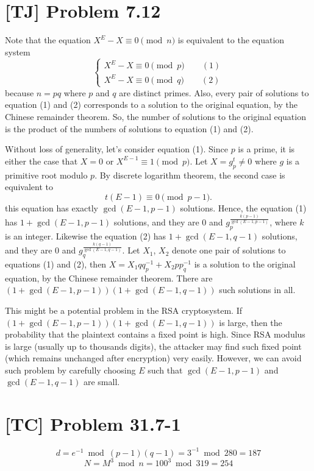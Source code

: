 \documentclass[a4paper,11pt]{article}
\begin{document}
  \section{[TJ] Problem 7.12}
  Note that the equation $X^E - X \equiv 0 \pmod n$ is equivalent to the equation system
$$ \begin{cases} X^E - X \equiv 0 \pmod p \qquad (1) \\ X^E - X \equiv 0 \pmod q \qquad (2) \end{cases} $$
  because $n = pq$ where $p$ and $q$ are distinct primes. Also, every pair of solutions to equation (1) and (2) corresponds to a solution to the original equation, by the Chinese remainder theorem. So, the number of solutions to the original equation is the product of the numbers of solutions to equation (1) and (2). \par
  Without loss of generality, let's consider equation (1). Since $p$ is a prime, it is either the case that $X = 0$ or $X^{E-1} \equiv 1 \pmod p$. Let $X = g_p^t \neq 0$ where $g$ is a primitive root modulo $p$. By discrete logarithm theorem, the second case is equivalent to
  $$t(E-1) \equiv 0 \pmod{p-1}.$$
  this equation has exactly $\gcd(E-1, p-1)$ solutions. Hence, the equation (1) has $1 + \gcd(E-1, p-1)$ solutions, and they are $0$ and $g_p^{\frac{k(p-1)}{\gcd(E-1, p-1)}}$, where $k$ is an integer. Likewise the equation (2) has $1 + \gcd(E-1, q-1)$ solutions, and they are $0$ and $g_q^{\frac{k(q-1)}{\gcd(E-1, q-1)}}$. Let $X_1$, $X_2$ denote one pair of solutions to equations (1) and (2), then $X = X_1 q q^{-1}_p + X_2 p p^{-1}_q$ is a solution to the original equation, by the Chinese remainder theorem. There are $(1 + \gcd(E-1, p-1))(1 + \gcd(E-1, q-1))$ such solutions in all. \par
  This might be a potential problem in the RSA cryptosystem. If $(1 + \gcd(E-1, p-1))(1 + \gcd(E-1, q-1))$ is large, then the probability that the plaintext contains a fixed point is high. Since RSA modulus is large (usually up to thousands digits), the attacker may find such fixed point (which remains unchanged after encryption) very easily. However, we can avoid such problem by carefully choosing $E$ such that $\gcd(E-1, p-1)$ and $\gcd(E-1, q-1)$ are small.

  \section{[TC] Problem 31.7-1}
  $$ d = e^{-1} \bmod (p-1)(q-1) = 3^{-1} \bmod 280 = 187 $$
  $$ N = M^{3} \bmod n = 100^3 \bmod 319 = 254 $$
\end{document}

